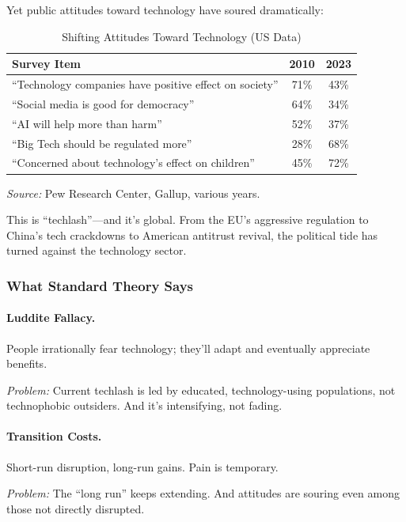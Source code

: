 Yet public attitudes toward technology have soured dramatically:

\begin{table}[htbp]
\centering
\caption{Shifting Attitudes Toward Technology (US Data)}
\label{tab:tech-attitudes}
\begin{tabular}{@{}lcc@{}}
\toprule
\textbf{Survey Item} & \textbf{2010} & \textbf{2023} \\
\midrule
``Technology companies have positive effect on society'' & 71\% & 43\% \\
``Social media is good for democracy'' & 64\% & 34\% \\
``AI will help more than harm'' & 52\% & 37\% \\
``Big Tech should be regulated more'' & 28\% & 68\% \\
``Concerned about technology's effect on children'' & 45\% & 72\% \\
\bottomrule
\end{tabular}
\begin{flushleft}
\small\textit{Source:} Pew Research Center, Gallup, various years.
\end{flushleft}
\end{table}

This is ``techlash''---and it's global. From the EU's aggressive regulation to 
China's tech crackdowns to American antitrust revival, the political tide has 
turned against the technology sector.

\subsubsection{What Standard Theory Says}

\paragraph{Luddite Fallacy.}
People irrationally fear technology; they'll adapt and eventually appreciate benefits.

\textit{Problem:} Current techlash is led by educated, technology-using populations, 
not technophobic outsiders. And it's intensifying, not fading.

\paragraph{Transition Costs.}
Short-run disruption, long-run gains. Pain is temporary.

\textit{Problem:} The ``long run'' keeps extending. And attitudes are souring 
even among those not directly disrupted.

